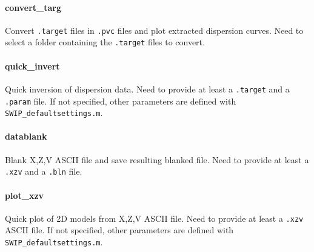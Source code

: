 \documentclass[twoside,a4paper]{article}
\begin{document}
\paragraph{convert\_targ}
Convert \verb|.target| files in \verb|.pvc| files and plot extracted dispersion curves. Need to select a folder containing the \verb|.target| files to convert.

\paragraph{quick\_invert}
Quick inversion of dispersion data. Need to provide at least a \verb|.target| and a \verb|.param| file. If not specified, other parameters are defined with \verb|SWIP_defaultsettings.m|.

\paragraph{datablank}
Blank X,Z,V ASCII file and save resulting blanked file. Need to provide at least a \verb|.xzv| and a \verb|.bln| file.

\paragraph{plot\_xzv}
Quick plot of 2D models from X,Z,V ASCII file. Need to provide at least a \verb|.xzv| ASCII file. If not specified, other parameters are defined with \verb|SWIP_defaultsettings.m|.
\end{document}
